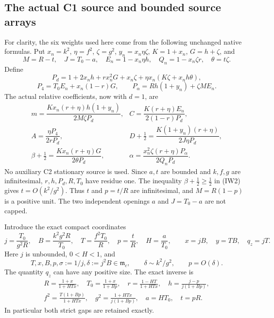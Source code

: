 \subsection{The actual C1 source and bounded source arrays}

For clarity, the six weights used here come from the following
unchanged native formulas. Put $x_n=k^2$, $\eta=f^2$, $\zeta=g^2$,
$y_n=x_n\eta\zeta$, $K=1+x_n$, $G=h+\zeta$, and
\[
 M=R-t,\quad J=T_0-a,\quad E_n=1-x_n\eta h,
 \quad Q_n=1-x_n\zeta r,\quad \theta=t\zeta.
\]
Define
\[
 P_d=1+2x_nh+rx_n^2G+x_n\zeta
       +\eta x_n(K\zeta+x_nh\theta),
\]
\[
 P_4=T_0E_n+x_n(1-r)G,\qquad
 P_\alpha=Rh(1+y_n)+\zeta M E_n.
\]
The actual relative coefficients, now with $d=1$, are
\[
\begin{array}{ll}
 m=\dfrac{Kx_n(r+\eta)h(1+y_n)}{2M\zeta P_d},&
 C=\dfrac{K(r+\eta)E_n}{2(1-r)P_d},\\[4pt]
 A=\dfrac{\eta P_4}{2rP_d},&
 D+\tfrac12=\dfrac{K(1+y_n)(r+\eta)}{2J\eta P_d},\\[4pt]
 \beta+\tfrac12=\dfrac{Kx_n(r+\eta)G}{2\theta P_d},&
 \alpha=\dfrac{x_n^2\zeta(r+\eta)P_\alpha}{2Q_nP_d}.
\end{array}                                                     \tag{IW2}
\]
No auxiliary C2 stationary source is used.
Since $a,t$ are bounded and $k,f,g$ are infinitesimal,
$r,h,P_d,R,T_0$ have residue one. The inequality
$\beta+\tfrac12\geq\tfrac12$ in (IW2) gives
$t=O(k^2/g^2)$. Thus $t$ and $p=t/R$ are infinitesimal, and
$M=R(1-p)$ is a positive unit. The two independent openings
$a$ and $J=T_0-a$ are not capped.

Introduce the exact compact coordinates
\[
 j=\frac{T_0}{g^2R},\quad B=\frac{k^2g^2R}{T_0},\quad
 T=\frac{f^2T_0}{R},\quad p=\frac tR,\quad H=\frac a{T_0},
 \qquad x=jB,\quad y=TB,\quad q_z=jT.                    \tag{IW3}
\]
Here $j$ is unbounded, $0<H<1$, and
\[
 T,x,B,p,\sigma:=1/j,\delta:=j^2B\in\mathfrak m_c,
 \qquad \delta\sim k^2/g^2,\qquad p=O(\delta).
                                                               \tag{IW4}
\]
The quantity $q_z$ can have any positive size. The exact inverse is
\[
\begin{gathered}
 R=\frac{1+x}{1+HTx},\quad T_0=\frac{1+x}{1+Bp},\quad
 r=\frac{1-HT}{1+HTx},\quad h=\frac{j-p}{j(1+Bp)},\\
 f^2=\frac{T(1+Bp)}{1+HTx},\quad
 g^2=\frac{1+HTx}{j(1+Bp)},\quad a=HT_0,\quad t=pR.
\end{gathered}                                                   \tag{IW5}
\]
In particular both strict gaps are retained exactly.

